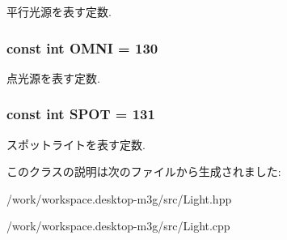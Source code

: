 平行光源を表す定数. \hypertarget{classm3g_1_1Light_34d360bb8395ad7fbcd3ec286ece64cb}{
\subsubsection[{OMNI}]{\setlength{\rightskip}{0pt plus 5cm}const int {\bf OMNI} = 130}}
\label{classm3g_1_1Light_34d360bb8395ad7fbcd3ec286ece64cb}


点光源を表す定数. \hypertarget{classm3g_1_1Light_c44aef16b96dc8fd8b134416964a7de9}{
\subsubsection[{SPOT}]{\setlength{\rightskip}{0pt plus 5cm}const int {\bf SPOT} = 131}}
\label{classm3g_1_1Light_c44aef16b96dc8fd8b134416964a7de9}


スポットライトを表す定数. 

このクラスの説明は次のファイルから生成されました:\begin{CompactItemize}
\item 
/work/workspace.desktop-m3g/src/Light.hpp\item 
/work/workspace.desktop-m3g/src/Light.cpp\end{CompactItemize}
